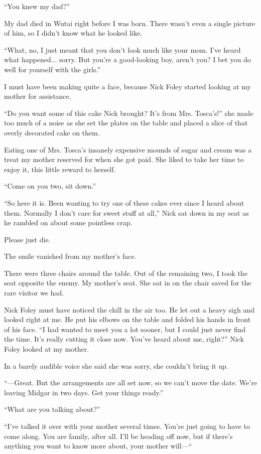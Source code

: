 \documentclass[oneside]{book}
\begin{document}
“You knew my dad?”

My dad died in Wutai right before I was born. There wasn’t even a single picture of him, so I didn’t know what he looked like.

“What, no, I just meant that you don’t look much like your mom. I’ve heard what happened... sorry. But you’re a good-looking boy, aren’t you? I bet you do well for yourself with the girls.”

I must have been making quite a face, because Nick Foley started looking at my mother for assistance.

“Do you want some of this cake Nick brought? It’s from Mrs. Tosca’s!” she made too much of a noise as she set the plates on the table and placed a slice of that overly decorated cake on them.

Eating one of Mrs. Tosca’s insanely expensive mounds of sugar and cream was a treat my mother reserved for when she got paid. She liked to take her time to enjoy it, this little reward to herself.

“Come on you two, sit down.”

“So here it is. Been wanting to try one of these cakes ever since I heard about them. Normally I don’t care for sweet stuff at all,” Nick sat down in my seat as he rambled on about some pointless crap.

Please just die.

The smile vanished from my mother’s face.

There were three chairs around the table. Out of the remaining two, I took the seat opposite the enemy. My mother’s seat. She sat in on the chair saved for the rare visitor we had.

Nick Foley must have noticed the chill in the air too. He let out a heavy sigh and looked right at me. He put his elbows on the table and folded his hands in front of his face. “I had wanted to meet you a lot sooner, but I could just never find the time. It’s really cutting it close now. You’ve heard about me, right?” Nick Foley looked at my mother.

In a barely audible voice she said she was sorry, she couldn’t bring it up.

“—Great. But the arrangements are all set now, so we can’t move the date. We’re leaving Midgar in two days. Get your things ready.”

“What are you talking about?”

“I’ve talked it over with your mother several times. You’re just going to have to come along. You are family, after all. I’ll be heading off now, but if there’s anything you want to know more about, your mother will—“
\end{document}
